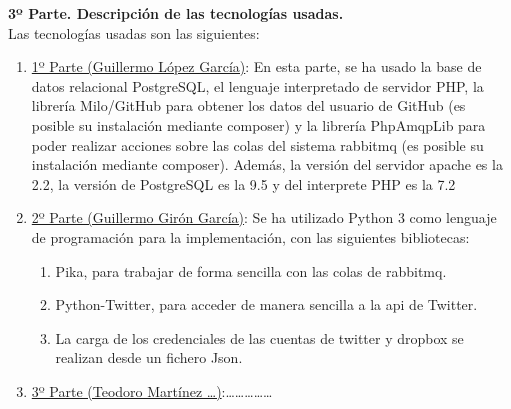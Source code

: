 \documentclass{article}
\begin{document}
\textbf{3º Parte. Descripción de las tecnologías usadas.}\\
Las tecnologías usadas son las siguientes:
\begin{enumerate}
    \item \underline{1º Parte (Guillermo López García)}: En esta parte, se ha usado
        la base de datos relacional PostgreSQL, el lenguaje interpretado de servidor
        PHP, la librería Milo/GitHub para obtener los datos del usuario de GitHub
        (es posible su instalación mediante composer) y la librería PhpAmqpLib para
        poder realizar acciones sobre las colas del sistema rabbitmq (es posible su
        instalación mediante composer). Además, la versión del servidor apache es la
        2.2, la versión de PostgreSQL es la 9.5 y del interprete PHP es la 7.2
    \item \underline{2º Parte (Guillermo Girón García)}: Se ha utilizado Python 3 como
    lenguaje de programación para la implementación, con las siguientes bibliotecas:
    \begin{enumerate}
        \item Pika, para trabajar de forma sencilla con las colas de rabbitmq. 
        \item Python-Twitter, para acceder de manera sencilla a la api de Twitter. 
        \item La carga de los credenciales de las cuentas de twitter y dropbox se realizan desde un fichero Json.
    \end{enumerate} 
    \item \underline{3º Parte (Teodoro Martínez \ldots)}:\ldots\ldots\ldots\ldots\ldots
\end{enumerate}
\end{document}
